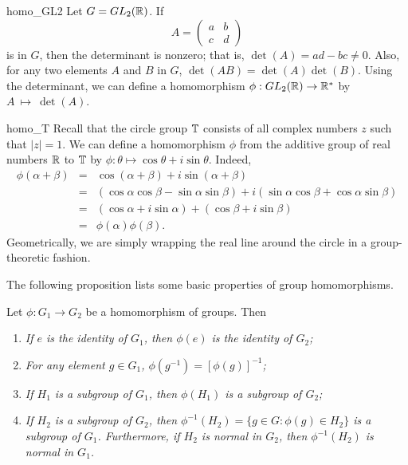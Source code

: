  
\begin{example}{homo_GL2}
Let $G = GL_2( {\Bbb R })$. If
$$
A=
\left(
\begin{array}{cc}
a & b \\
c & d
\end{array}
\right)
$$
is in $G$, then the determinant is  nonzero; that is, $\det(A) = ad -bc
\neq 0$.  Also, for any two elements $A$ and $B$ in $G$, $\det(AB) =
\det(A) \det(B)$. Using the determinant, we can define a homomorphism
$\phi : GL_2( {\Bbb R }) \rightarrow {\Bbb R}^\ast$ by
$A~\mapsto~\det(A)$.  
\mbox{\vspace{1in}}
\end{example}
 
 
\begin{example}{homo_T}
Recall that the circle group ${ \Bbb T}$ consists of all complex
numbers $z$ such that $|z|=1$. We can define a homomorphism $\phi$
from the additive group of real numbers ${\Bbb R}$ to ${\Bbb T}$ by
$\phi : \theta \mapsto \cos \theta + i \sin \theta$. Indeed, 
\begin{eqnarray*}
\phi( \alpha + \beta )
& = &
\cos( \alpha + \beta ) + i \sin( \alpha + \beta ) \\
& = &
(\cos \alpha \cos \beta - \sin \alpha \sin \beta)  + i( \sin \alpha 
\cos \beta + \cos \alpha \sin \beta ) \\
& = &
(\cos \alpha + i \sin \alpha ) + (\cos \beta + i \sin \beta
) \\
& = & \phi( \alpha ) \phi( \beta ).
\end{eqnarray*}
Geometrically, we are simply wrapping the real line around the circle 
in a group-theoretic fashion. 
\end{example}

 
The following proposition lists some basic properties of group
homomorphisms.
 
 
\begin{proposition}
Let $\phi : G_1 \rightarrow G_2$ be a homomorphism of groups. Then 
\begin{enumerate}
 
\rm \item \it
If $e$ is the identity of $G_1$, then $\phi( e)$ is the identity of
$G_2$;  
 
\rm \item \it
For any element $g \in G_1$, $\phi( g^{-1}) = [\phi( g )]^{- 1}$;
 
\rm \item \it
If $H_1$ is a subgroup of $G_1$, then $\phi( H_1 )$ is a subgroup of
$G_2$;
 
\rm \item \it
If $H_2$ is a  subgroup of $G_2$, then $\phi^{-1}(H_2) = \{ g \in G :
\phi(g) \in H_2 \}$ is a subgroup of $G_1$. Furthermore, if $H_2$ is
normal in $G_2$, then $\phi^{-1}(H_2)$ is normal in $G_1$. 
 
\end{enumerate}
\end{proposition}
 
